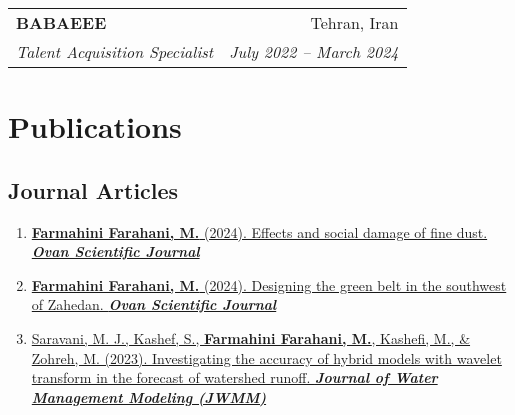 \documentclass[letterpaper,11pt]{article}
\makeatletter
\newcommand{\ressubheading}[4]{
	\begin{tabular*}{6.5in}{l@{\cftdotfill{\cftsecdotsep}\extracolsep{\fill}}r}
		\textbf{#1} & #2 \\
		\textit{#3} & \textit{#4} \\
	\end{tabular*}\vspace{-8pt}
}
\makeatother
\begin{document}
	\vspace{0.99em} 
	
	\ressubheading{BABAEEE}{Tehran, Iran}{Talent Acquisition Specialist}{July 2022 – March 2024}
	
	
	
	\section{Publications}
	\begin{justify}
		\subsection*{Journal Articles}
		\begin{enumerate}[label=\arabic*.,left=0pt,topsep=7.5pt,partopsep=0pt,itemsep=3.5pt,parsep=0pt]
			\item \href{https://www.researchgate.net/publication/381203362_Effects_and_social_damage_of_fine_dust}{\textbf{Farmahini Farahani, M.} (2024). Effects and social damage of fine dust. \textit{\textbf{Ovan Scientific Journal}}}
			\item \href{https://www.researchgate.net/publication/381197940_Designing_the_Green_Belt_in_the_southwest_of_Zahedan}{\textbf{Farmahini Farahani, M.} (2024). Designing the green belt in the southwest of Zahedan. \textit{\textbf{Ovan Scientific Journal}}}
			\item \href{https://www.researchgate.net/publication/371328175_Investigating_the_Accuracy_of_Hybrid_Models_with_Wavelet_Transform_in_the_Forecast_of_Watershed_Runoff}{Saravani, M. J., Kashef, S., \textbf{Farmahini Farahani, M.}, Kashefi, M., \& Zohreh, M. (2023). Investigating the accuracy of hybrid models with wavelet transform in the forecast of watershed runoff. \textit{\textbf{Journal of Water Management Modeling (JWMM)}}}
		\end{enumerate}
		

\end{justify}
\end{document}
